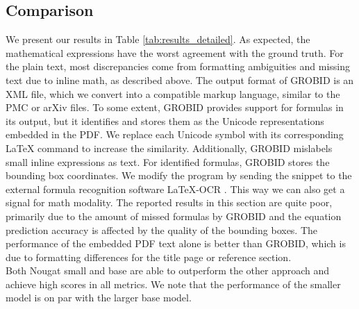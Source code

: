 \documentclass[]{article}
\begin{document}
\subsection{Comparison}
We present our results in Table \ref{tab:results_detailed}. 
As expected, the mathematical expressions have the worst agreement with the ground truth. 
For the plain text, most discrepancies come from formatting ambiguities and missing text due to inline math, as described above.
The output format of GROBID is an XML file, which we convert into a compatible markup language, similar to the PMC or arXiv files. 
To some extent, GROBID provides support for formulas in its output, but it identifies and stores them as the Unicode representations embedded in the PDF. We replace each Unicode symbol with its corresponding LaTeX command to increase the similarity. Additionally, GROBID mislabels small inline expressions as text. For identified formulas, GROBID stores the bounding box coordinates. We modify the program by sending the snippet to the external formula recognition software LaTeX-OCR \cite{blecher_pix2tex_2023}. This way we can also get a signal for math modality. The reported results in this section are quite poor, primarily due to the amount of missed formulas by GROBID and the equation prediction accuracy is affected by the quality of the bounding boxes. The performance of the embedded PDF text alone is better than GROBID, which is due to formatting differences for the title page or reference section.
\\Both Nougat small and base are able to outperform the other approach and achieve high scores in all metrics. We note that the performance of the smaller model is on par with the larger base model.
\end{document}
